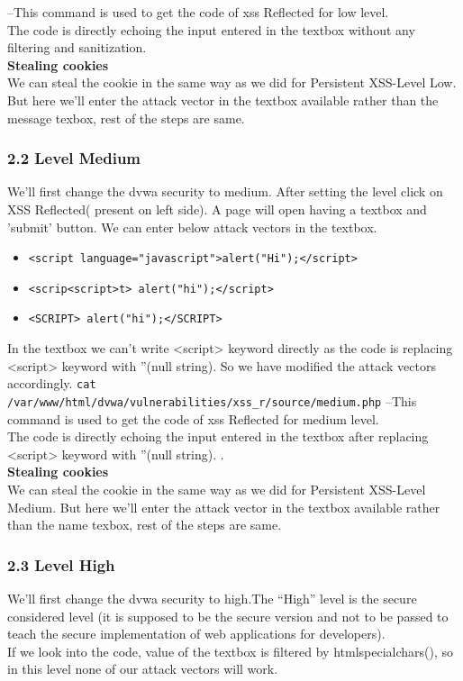 \documentclass{article}
\begin{document}
  --This command is used to get the code of xss Reflected for low level.\\
The code is directly echoing the input entered in the textbox without any filtering and sanitization.\\
\textbf{Stealing cookies}\\
We can steal the cookie in the same way as we did for Persistent XSS-Level Low. But here we'll enter the attack vector in the textbox available rather than the message texbox, rest of the steps are same.

\subsubsection*{2.2 Level Medium}
We'll first change the dvwa security to medium. After setting the level click on XSS Reflected( present on left side). A page will open having a textbox and 'submit' button. We can enter below attack vectors in the textbox.\\
\begin{itemize}
     \item {\tt <script language="javascript">alert("Hi");</script>}
     \item {\tt <scrip<script>t> alert("hi");</script>}
     \item {\tt <SCRIPT> alert("hi");</SCRIPT>}
\end{itemize}

In the textbox we can't write <script> keyword directly as the code is replacing <script> keyword with ''(null string). So we have modified the attack vectors accordingly.
{\tt cat /var/www/html/dvwa/vulnerabilities/xss\_r/source/medium.php} --This command is used to get the code of xss Reflected for medium level.\\
The code is directly echoing the input entered in the textbox after replacing <script> keyword with ''(null string). .\\
\textbf{Stealing cookies}\\
We can steal the cookie in the same way as we did for Persistent XSS-Level Medium. But here we'll enter the attack vector in the textbox available rather than the name texbox, rest of the steps are same.
\subsubsection*{2.3 Level High}
We'll first change the dvwa security to high.The “High” level is the secure considered level (it is supposed to be the secure version and not to be passed to teach the secure implementation of web applications for developers).\\
If we look into the code, value of the textbox is filtered by htmlspecialchars(), so in this level none of our attack vectors will work.
\end{document}
